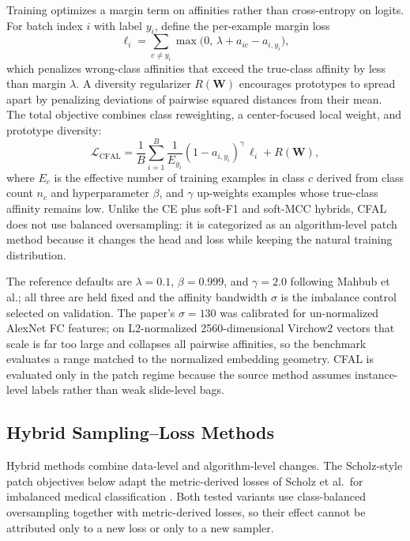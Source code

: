 \documentclass[11pt]{article}
\begin{document}
Training optimizes a margin term on affinities rather than cross-entropy on logits. For batch index $i$ with label $y_i$, define the per-example margin loss
\begin{equation}
  \ell_i=\sum_{c\ne y_i}\max\bigl(0,\, \lambda + a_{ic}-a_{i,y_i}\bigr),
  \label{eq:cfal-margin}
\end{equation}
\noindent which penalizes wrong-class affinities that exceed the true-class affinity by less than margin $\lambda$. A diversity regularizer $R(\mathbf{W})$ encourages prototypes to spread apart by penalizing deviations of pairwise squared distances from their mean. The total objective combines class reweighting, a center-focused local weight, and prototype diversity:
\begin{equation}
  \mathcal{L}_{\mathrm{CFAL}}=
  \frac{1}{B}\sum_{i=1}^{B}
  \frac{1}{E_{y_i}}
  (1-a_{i,y_i})^{\gamma}\,\ell_i
  + R(\mathbf{W}),
  \label{eq:cfal-total}
\end{equation}
\noindent where $E_c$ is the effective number of training examples in class $c$ derived from class count $n_c$ and hyperparameter $\beta$, and $\gamma$ up-weights examples whose true-class affinity remains low. Unlike the CE plus soft-F1 and soft-MCC hybrids, CFAL does not use balanced oversampling: it is categorized as an algorithm-level patch method because it changes the head and loss while keeping the natural training distribution.

The reference defaults are $\lambda=\num{0.1}$, $\beta=\num{0.999}$, and $\gamma=\num{2.0}$ following Mahbub et al.; all three are held fixed and the affinity bandwidth $\sigma$ is the imbalance control selected on validation. The paper's $\sigma=\num{130}$ was calibrated for un-normalized AlexNet FC features; on L2-normalized \num{2560}-dimensional Virchow2 vectors that scale is far too large and collapses all pairwise affinities, so the benchmark evaluates a range matched to the normalized embedding geometry. CFAL is evaluated only in the patch regime because the source method assumes instance-level labels rather than weak slide-level bags.

\subsection{Hybrid Sampling--Loss Methods}
Hybrid methods combine data-level and algorithm-level changes. The Scholz-style patch objectives below adapt the metric-derived losses of Scholz et al.\ for imbalanced medical classification \citep{scholz2024imbalanceAware}. Both tested variants use class-balanced oversampling together with metric-derived losses, so their effect cannot be attributed only to a new loss or only to a new sampler.
\end{document}
